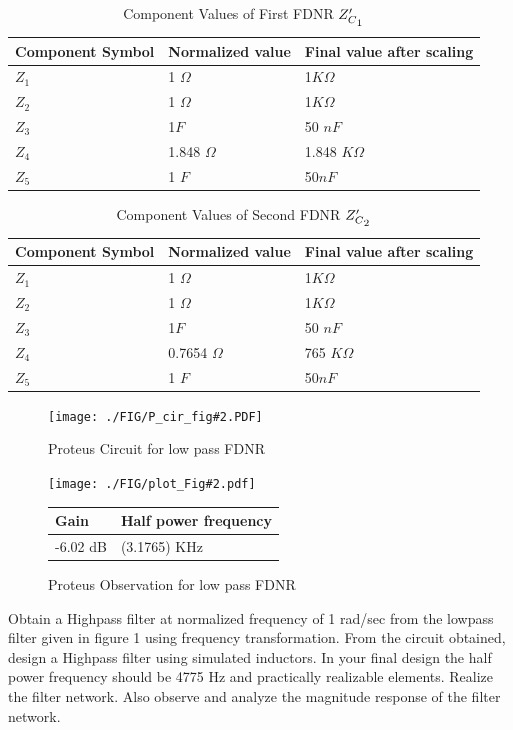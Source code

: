 \documentclass[a4paper,11pt]{article}
\newcommand{\Porcirobs}[4]{
    \begin{figure}[H] %
        \centering
        \texttt{[image: ./FIG/P\_cir\_fig\#2.PDF]}
        \caption{Proteus Circuit for #2}
    \end{figure}


    \begin{figure}[H]  %
        \centering
        \texttt{[image: ./FIG/plot\_Fig\#2.pdf]}
        \begin{tabular}[H]{| m{14em}| m{22em}|}
            \hline
            \rowcolor[rgb]{0.569,0.647,0.947} \textbf{Gain } & \textbf{Half power frequency} \\ \hline
            #3 dB         & (#4) KHz     \\  \hline
        \end{tabular}
        \caption{Proteus Observation for #2}
    \end{figure}
}
\begin{document}
\begin{table}[H]
    \centering
    \begin{tabular}[H]{| m{10em}|m{10em}|m{14em}|}
        \hline
        \rowcolor[rgb]{0.569,0.647,0.947}
        \textbf{Component Symbol}
              & \textbf{Normalized value }
              & \textbf{Final value after scaling}                   \\
        \hline
        $Z_1$ & 1 $\Omega$                         & 1$K\Omega$      \\ \hline
        $Z_2$ & 1  $\Omega$                        & 1$K\Omega$      \\ \hline
        $Z_3$ & 1$F$                               & 50 $nF$         \\ \hline
        $Z_4$ & 1.848 $\Omega$                     & 1.848 $K\Omega$ \\ \hline
        $Z_5$ & 1 $F$                              & 50$nF$          \\ \hline
    \end{tabular}
    \caption{Component Values of First FDNR  $Z'_{C\textsubscript{$1$}}$}
\end{table}

\begin{table}[H]
    \centering
    \begin{tabular}[H]{| m{10em}|m{10em}|m{14em}|}
        \hline
        \rowcolor[rgb]{0.569,0.647,0.947}
        \textbf{Component Symbol}
              & \textbf{Normalized value }
              & \textbf{Final value after scaling}                 \\
        \hline
        $Z_1$ & 1 $\Omega$                         & 1$K\Omega$    \\ \hline
        $Z_2$ & 1  $\Omega$                        & 1$K\Omega$    \\ \hline
        $Z_3$ & 1$F$                               & 50 $nF$       \\ \hline
        $Z_4$ & 0.7654 $\Omega$                    & 765 $K\Omega$ \\ \hline
        $Z_5$ & 1 $F$                              & 50$nF$        \\ \hline
    \end{tabular}
    \caption{Component Values of Second FDNR  $Z'_{C\textsubscript{$2$}}$}
\end{table}

\Porcirobs{0.95}{low pass FDNR}{-6.02}{3.1765}


\pagebreak
\begin{Q}
    {Obtain a Highpass filter at normalized frequency of 1 rad/sec from the lowpass filter given in
        figure 1 using frequency transformation. From the circuit obtained, design a Highpass filter using simulated inductors. In your final design the half power frequency should be 4775 Hz and practically realizable elements. Realize the filter network. Also observe and analyze the magnitude response of the filter network.}
\end{Q}
\end{document}
